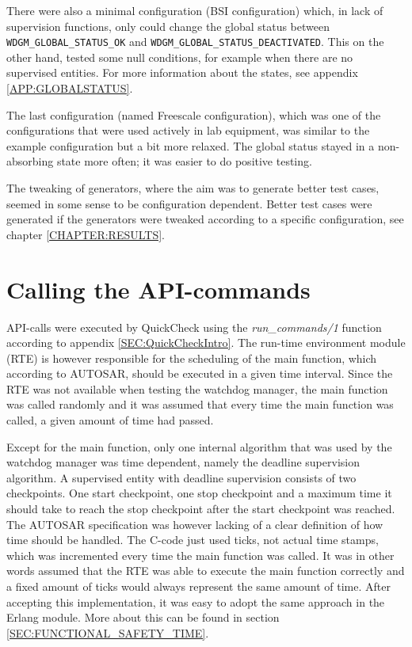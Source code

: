 There were also a minimal configuration (BSI configuration) which, in
lack of supervision functions, only could change the global status
between \lstinline!WDGM_GLOBAL_STATUS_OK! and
\lstinline!WDGM_GLOBAL_STATUS_DEACTIVATED!. This on the other hand,
tested some null conditions, for example when there are no supervised
entities. For more information about the states, see appendix \ref{APP:GLOBALSTATUS}.

The last configuration (named Freescale configuration), which was one
of the configurations that were used actively in lab equipment, was
similar to the example configuration but a bit more relaxed. The
global status stayed in a non-absorbing state more often; it was
easier to do positive testing.

The tweaking of generators, where the aim was to generate better test
cases, seemed in some sense to be configuration dependent. Better test
cases were generated if the generators were tweaked according to a
specific configuration, see chapter \ref{CHAPTER:RESULTS}.

\section{Calling the API-commands}
\label{SEC:CALLING_COMMANDS}
API-calls were executed by QuickCheck using the \emph{run\_commands/1}
function according to appendix \ref{SEC:QuickCheckIntro}. The run-time
environment module (RTE) is however responsible for the scheduling of
the main function, which according to AUTOSAR, should be executed in a
given time interval. Since the RTE was not available when testing the
watchdog manager, the main function was called randomly and it was
assumed that every time the main function was called, a given amount of
time had passed.

Except for the main function, only one internal algorithm that was
used by the watchdog manager was time dependent, namely the deadline
supervision algorithm. A supervised entity with deadline supervision
consists of two checkpoints. One start checkpoint, one stop checkpoint
and a maximum time it should take to reach the stop checkpoint after
the start checkpoint was reached. The AUTOSAR specification was
however lacking of a clear definition of how time should be
handled. The C-code just used ticks, not actual time stamps, which
was incremented every time the main function was called. It was in
other words assumed that the RTE was able to execute the main function
correctly and a fixed amount of ticks would always represent the same
amount of time. After accepting this implementation, it was easy to adopt the
same approach in the Erlang module. More about this can be found in section
\ref{SEC:FUNCTIONAL_SAFETY_TIME}.

